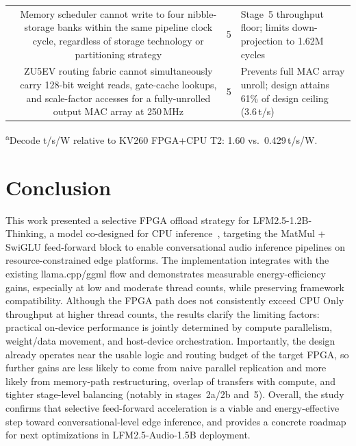\documentclass[manuscript,]{acmart} %
\begin{document}
\begin{table}[H]
\begin{tabular}{c c r c r p{2.8cm}}
& \multicolumn{3}{p{5.5cm}}{Memory scheduler cannot write to four nibble-storage banks within the same pipeline clock cycle, regardless of storage technology or partitioning strategy} & 5 & Stage~5 throughput floor; limits down-projection to 1.62M cycles \\
& \multicolumn{3}{p{5.5cm}}{ZU5EV routing fabric cannot simultaneously carry 128-bit weight reads, gate-cache lookups, and scale-factor accesses for a fully-unrolled output MAC array at 250\,MHz} & 5 & Prevents full MAC array unroll; design attains 61\% of design ceiling (3.6\,t/s) \\
\hline
\end{tabular}
\par\vspace{4pt}
{\footnotesize\textsuperscript{a}Decode t/s/W relative to KV260 FPGA+CPU T2: 1.60 vs.\ 0.429\,t/s/W.}
\end{table}

\section{Conclusion} \label{sec:conclusion}
This work presented a selective FPGA offload strategy for LFM2.5-1.2B-Thinking, a model co-designed for CPU inference~\cite{amini2025lfm2technicalreport}, targeting the MatMul + SwiGLU feed-forward block to enable conversational audio inference pipelines on resource-constrained edge platforms. The implementation integrates with the existing llama.cpp/ggml flow and demonstrates measurable energy-efficiency gains, especially at low and moderate thread counts, while preserving framework compatibility. Although the FPGA path does not consistently exceed CPU Only throughput at higher thread counts, the results clarify the limiting factors: practical on-device performance is jointly determined by compute parallelism, weight/data movement, and host-device orchestration. Importantly, the design already operates near the usable logic and routing budget of the target FPGA, so further gains are less likely to come from naive parallel replication and more likely from memory-path restructuring, overlap of transfers with compute, and tighter stage-level balancing (notably in stages~2a/2b and~5). Overall, the study confirms that selective feed-forward acceleration is a viable and energy-effective step toward conversational-level edge inference, and provides a concrete roadmap for next optimizations in LFM2.5-Audio-1.5B deployment.
\end{document}
